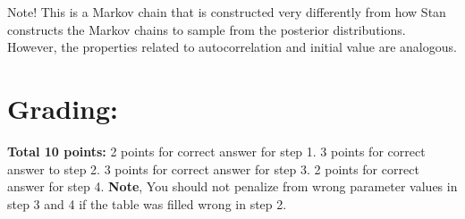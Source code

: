 \documentclass[
]{article}
\begin{document}
Note! This is a Markov chain that is constructed very differently from
how Stan constructs the Markov chains to sample from the posterior
distributions. However, the properties related to autocorrelation and
initial value are analogous.

\hypertarget{grading}{%
\section{Grading:}\label{grading}}

\textbf{Total 10 points:} 2 points for correct answer for step 1. 3
points for correct answer to step 2. 3 points for correct answer for
step 3. 2 points for correct answer for step 4. \textbf{Note}, You
should not penalize from wrong parameter values in step 3 and 4 if the
table was filled wrong in step 2.
\end{document}
